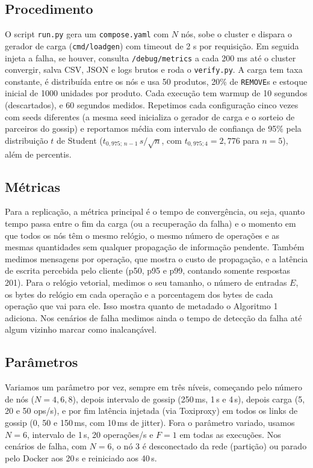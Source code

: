 \documentclass[conference,a4paper]{IEEEtran}
\begin{document}
\subsection{Procedimento}
O script \texttt{run.py} gera um \texttt{compose.yaml} com $N$ nós, sobe o
cluster e dispara o gerador de carga (\texttt{cmd/loadgen}) com timeout de 2 s por requisição. Em seguida injeta a falha, se houver, consulta \texttt{/debug/metrics} a cada 200 ms até o cluster convergir, salva CSV, JSON e logs brutos e roda o \texttt{verify.py}. A carga tem taxa constante, é distribuída entre os nós e usa 50 produtos, 20\% de \texttt{REMOVE}s e estoque inicial de 1000 unidades por produto. Cada execução tem warmup de 10 segundos (descartados), e 60 segundos medidos. Repetimos cada configuração cinco vezes com seeds diferentes (a mesma seed inicializa o gerador de carga e o sorteio de parceiros do gossip) e reportamos média com
intervalo de confiança de 95\% pela distribuição $t$ de Student
($t_{0{,}975;\,n-1}\,s/\sqrt{n}$, com $t_{0{,}975;4}=2{,}776$ para $n=5$), além
de percentis.

\subsection{Métricas}
Para a replicação, a métrica principal é o tempo de convergência, ou seja, quanto tempo passa entre o fim da carga (ou a recuperação da falha) e o momento em
que todos os nós têm o mesmo relógio, o mesmo número de operações e as mesmas
quantidades sem qualquer propagação de informação pendente. Também medimos
mensagens por operação, que mostra o custo de propagação, e a latência de escrita percebida pelo cliente (p50, p95 e p99, contando somente respostas 201). Para o relógio vetorial, medimos o seu tamanho, o número de entradas $E$, os bytes do relógio em cada operação e a porcentagem dos bytes de cada operação que vai para ele. Isso mostra quanto de metadado o Algoritmo 1 adiciona. Nos cenários de falha medimos ainda o tempo de detecção da falha até algum vizinho marcar como inalcançável.

\subsection{Parâmetros}
Variamos um parâmetro por vez, sempre em três níveis, começando pelo número de nós
($N=4,6,8$), depois intervalo de gossip (250\,ms, 1\,s e 4\,s), depois carga (5, 20 e 50 ops/s), e por fim latência injetada (via Toxiproxy) em todos os links de gossip (0, 50 e 150\,ms, com 10\,ms de jitter). Fora o parâmetro variado, usamos $N=6$, intervalo de 1\,s, 20 operações/s e $F=1$ em todas as execuções. Nos cenários de falha, com $N=6$, o nó 3 é desconectado da rede (partição) ou parado pelo Docker aos 20\,s e reiniciado aos 40\,s.
\end{document}

